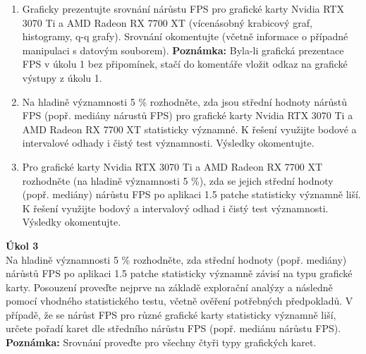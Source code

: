\documentclass[a4paper,12pt]{article}
\begin{document}
\begin{enumerate}
    \begin{enumerate}
        \item Graficky prezentujte srovnání nárůstu FPS pro grafické karty Nvidia RTX 3070 Ti a AMD Radeon RX
7700 XT (vícenásobný krabicový graf, histogramy, q-q grafy). Srovnání okomentujte (včetně
informace o případné manipulaci s datovým souborem). \textbf{Poznámka:} Byla-li grafická prezentace FPS
v úkolu 1 bez připomínek, stačí do komentáře vložit odkaz na grafické výstupy z úkolu 1.


\newpage
    \item Na hladině významnosti 5 \% rozhodněte, zda jsou střední hodnoty nárůstů FPS (popř. mediány
nárustů FPS) pro grafické karty Nvidia RTX 3070 Ti a AMD Radeon RX 7700 XT statisticky významné.
K řešení využijte bodové a intervalové odhady i čistý test významnosti. Výsledky okomentujte.
\newpage
    \item Pro grafické karty Nvidia RTX 3070 Ti a AMD Radeon RX 7700 XT rozhodněte (na hladině
významnosti 5 \%), zda se jejich střední hodnoty (popř. mediány) nárůstu FPS po aplikaci 1.5 patche
statisticky významně liší. K řešení využijte bodový a intervalový odhad i čistý test významnosti.
Výsledky okomentujte.
    \end{enumerate}
\end{enumerate}
\newpage
\textbf{Úkol 3}\\
Na hladině významnosti 5 \% rozhodněte, zda střední hodnoty (popř. mediány) nárůstů FPS po aplikaci
1.5 patche statisticky významně závisí na typu grafické karty. Posouzení proveďte nejprve na základě
explorační analýzy a následně pomocí vhodného statistického testu, včetně ověření potřebných
předpokladů. V případě, že se nárůst FPS pro různé grafické karty statisticky významně liší, určete
pořadí karet dle středního nárůstu FPS (popř. mediánu nárůstu FPS). \textbf{Poznámka:} Srovnání proveďte pro
všechny čtyři typy grafických karet.
\end{document}
